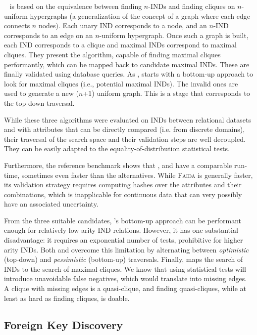 \Find~\cite{koeller2003discovery} is based on the equivalence
between finding $n$-INDs and finding cliques on $n$-uniform hypergraphs (a generalization
of the concept of a graph where each edge connects $n$ nodes). Each unary \gls{IND} corresponds
to a node, and an $n$-IND corresponds to an edge on an $n$-uniform hypergraph.
Once such a graph is built, each \gls{IND} corresponds to a clique and maximal \glspl{IND}
correspond to maximal cliques. They present the \Hyperclique algorithm,
capable of finding maximal cliques performantly, which can be mapped back to candidate
maximal \glspl{IND}. These are finally validated using database queries.
As \Zigzag, \Find starts with a bottom-up
approach to look for maximal cliques (i.e., potential maximal \glspl{IND}). The invalid ones
are used to generate a new ($n$+1) uniform graph. This is a stage that corresponds to the top-down
traversal.

While these three algorithms were evaluated on \glspl{IND} between relational datasets
and with attributes that can be directly compared (i.e. from discrete domains), their
traversal of the search space and their validation steps are well decoupled. They
can be easily adapted to the equality-of-distribution statistical tests.

Furthermore, the reference benchmark shows that \Mind, \Find
and \Zigzag have a comparable run-time, sometimes even
faster than the alternatives.
While \textsc{Faida} is generally faster, its
validation strategy requires computing hashes over the
attributes and their combinations, which is inapplicable
for continuous data that can very possibly have an associated uncertainty.

From the three suitable candidates, \Mind's bottom-up approach can be performant enough for
relatively low arity \gls{IND} relations. However, it has one substantial disadvantage:
it requires an exponential number of tests, prohibitive for higher arity \glspl{IND}.
Both \Zigzag and \Find overcome this limitation by alternating between \emph{optimistic}
(top-down) and \emph{pessimistic} (bottom-up) traversals.
Finally, \Find maps the search of \glspl{IND} to the search of maximal cliques. We know that
using statistical tests will introduce unavoidable false negatives, which would
translate into missing edges.
A clique with missing edges is a quasi-clique, and finding quasi-cliques, while at least
as hard as finding cliques, is doable.

\subsection{Foreign Key Discovery}

